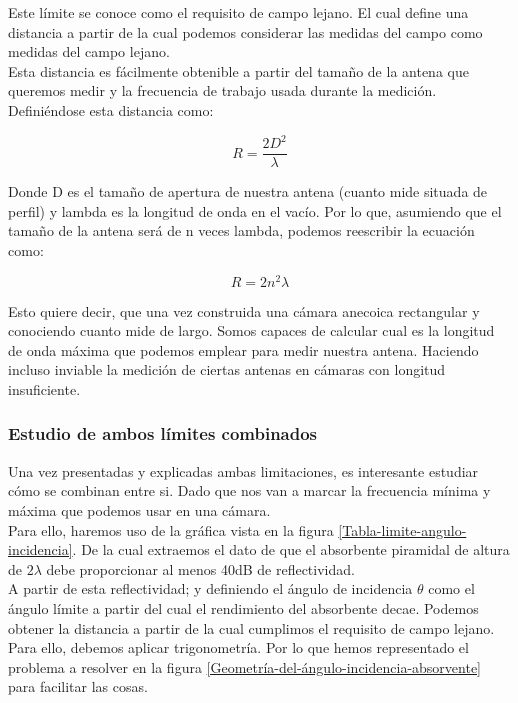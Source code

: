 \documentclass{article}
\begin{document}
Este límite se conoce como el requisito de campo lejano. El cual define una distancia a partir de la cual podemos considerar las medidas del campo como medidas del campo lejano. \\
Esta distancia es fácilmente obtenible a partir del tamaño de la antena que queremos medir y la frecuencia de trabajo usada durante la medición. Definiéndose esta distancia como: 

                            \begin{equation}
                            R =\frac{2D^2}{\lambda}
                            \end{equation}
                            
Donde D es el tamaño de apertura de nuestra antena (cuanto mide situada de perfil) y lambda es la longitud de onda en el vacío. Por lo que, asumiendo que el tamaño de la antena será de n veces lambda, podemos reescribir la ecuación como: 

                            \begin{equation}
                            R =2n^2\lambda
                            \end{equation}

Esto quiere decir, que una vez construida una cámara anecoica rectangular y conociendo cuanto mide de largo. Somos capaces de calcular cual es la longitud de onda máxima que podemos emplear para medir nuestra antena. Haciendo incluso inviable la medición de ciertas antenas en cámaras con longitud insuficiente. 

\newpage

\subsubsection{Estudio de ambos límites combinados}

Una vez presentadas y explicadas ambas limitaciones, es interesante estudiar cómo se combinan entre si. Dado que nos van a marcar la frecuencia mínima y máxima que podemos usar en una cámara. 
\\

Para ello, haremos uso de la gráfica vista en la figura \ref{Tabla-limite-angulo-incidencia}. De la cual extraemos el dato de que el absorbente piramidal de altura de $2\lambda$ debe proporcionar al menos 40dB de reflectividad. 
\\

A partir de esta reflectividad; y definiendo el ángulo de incidencia $\theta$ como el ángulo límite a partir del cual el rendimiento del absorbente decae. Podemos obtener la distancia a partir de la cual cumplimos el requisito de campo lejano.\\
Para ello, debemos aplicar trigonometría. Por lo que hemos representado el problema a resolver en la figura \ref{Geometría-del-ángulo-incidencia-absorvente} para facilitar las cosas. 
\end{document}
